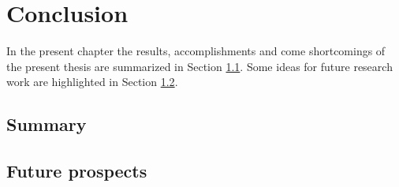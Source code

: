 \clearpage

\section{Conclusion}\label{chap:chap_5}

In the present chapter the results, accomplishments and come shortcomings of the present thesis are summarized in Section \ref{sec:subsec_5.1}. Some ideas for future research work are highlighted in Section \ref{sec:subsec_5.2}.


\subsection{Summary}\label{sec:subsec_5.1}


\subsection{Future prospects}\label{sec:subsec_5.2}

